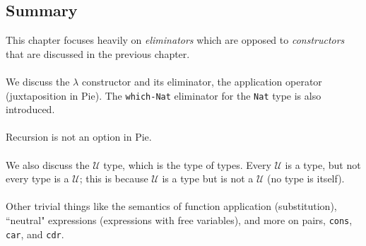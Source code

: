 \documentclass{article}
\newcommand{\ttt}[1]{\texttt{#1}}
\begin{document}
\subsection{Summary}
This chapter focuses heavily on \textit{eliminators} which are opposed to \textit{constructors} that are discussed in the previous chapter.
\\ \\
We discuss the \(\lambda\) constructor and its eliminator, the application operator (juxtaposition in Pie). The \ttt{which-Nat} eliminator for the \ttt{Nat} type is also introduced.
\\ \\
Recursion is not an option in Pie.
\\ \\
We also discuss the \(\mathcal{U}\) type, which is the type of types. Every \(\mathcal{U}\) is a type, but not every type is a \(\mathcal{U}\); this is because \(\mathcal{U}\) is a type but is not a \(\mathcal{U}\) (no type is itself).
\\ \\
Other trivial things like the semantics of function application (substitution), ``neutral" expressions (expressions with free variables), and more on pairs, \ttt{cons}, \ttt{car}, and \ttt{cdr}.
\end{document}
